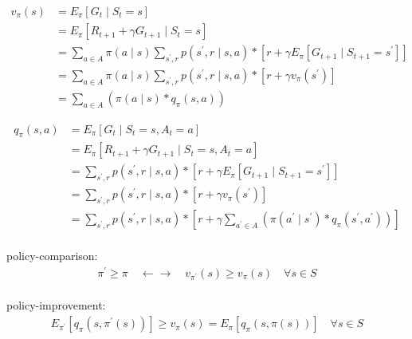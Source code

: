 \documentclass{article}
\begin{document}
\begin{align*}
    v_{\pi}(s)
      &= E_{\pi} \left[ G_{t} \mid S_{t}=s \right] \\
      &= E_{\pi} \left[ R_{t+1}+\gamma G_{t+1} \mid S_{t}=s \right] \\
      &= \sum_{a \in A} \pi(a \mid s) 
         \sum_{s^{\prime}, r} 
         p \left( s^{\prime}, r \mid s, a \right) * 
         \left[ r + \gamma 
         E_{\pi} \left[ G_{t+1} \mid S_{t+1}=s^{\prime} \right] \right] \\
      &= \sum_{a \in A} \pi(a \mid s) 
         \sum_{s^{\prime}, r} 
         p \left( s^{\prime}, r \mid s, a \right) * 
         \left[ r + \gamma 
         v_{\pi} \left( s^{\prime} \right) \right] \\
      &= \sum_{a \in A} 
         \left( \pi(a \mid s) * q_{\pi}(s, a) \right)
\end{align*}


\begin{align*}
    q_{\pi}(s, a)
      &= E_{\pi} \left[ G_{t} \mid S_{t}=s, A_{t}=a \right] \\
      &= E_{\pi} \left[ R_{t+1}+\gamma G_{t+1} 
         \mid S_{t}=s, A_{t}=a \right] \\
      &= \sum_{s^{\prime}, r} 
         p \left( s^{\prime}, r \mid s, a \right) * 
         \left[ r + \gamma 
         E_{\pi} \left[ G_{t+1} \mid S_{t+1}=s^{\prime} \right] \right] \\
      &= \sum_{s^{\prime}, r} 
         p \left( s^{\prime}, r \mid s, a \right) * 
         \left[ r + \gamma 
         v_{\pi} \left( s^{\prime} \right) \right] \\
      &= \sum_{s^{\prime}, r} 
         p \left( s^{\prime}, r \mid s, a \right) * 
         \left[ r + \gamma 
         \sum_{a^{\prime} \in A} 
         \left( \pi \left( a^{\prime} \mid s^{\prime} \right) * 
         q_{\pi} \left( s^{\prime}, a^{\prime} \right) \right) \right] \\
\end{align*}


policy-comparison: 
\begin{align*}
    \pi^{\prime} \geq \pi 
    \quad \leftarrow \rightarrow \quad 
    v_{\pi^{\prime}}(s) \geq v_{\pi}(s) 
    \quad \forall s \in S
\end{align*}
\\[6pt]


policy-improvement: 
\begin{align*}
    E_{\pi^{\prime}} 
    \left[ q_{\pi} \left( s, \pi^{\prime}(s) \right) \right] 
    \geq v_{\pi}(s) 
    = E_{\pi} \left[ q_{\pi} \left( s, \pi(s) \right) \right] 
    \quad \forall s \in S
\end{align*}
\\[6pt]
\end{document}
